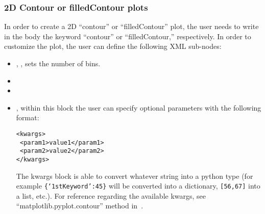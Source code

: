 \subsubsection{2D Contour or filledContour plots}
In order to create a 2D ``contour'' or ``filledContour'' plot, the user needs to
write in the  body the keyword ``contour'' or ``filledContour,''
respectively.
%
In order to customize the plot, the user can define the following XML sub-nodes:
\begin{itemize}
  \item {}, , sets the 
  number of bins.
  \item {}
  \item {}
  \item {}, within this block the user can specify optional
  parameters with the following format:

\begin{lstlisting}[style=XML]
<kwargs>
 <param1>value1</param1>
 <param2>value2</param2>
</kwargs>
\end{lstlisting}

    The kwargs block is able to convert whatever string into a python type (for
    example \texttt{\{`1stKeyword':45\}} will
    be converted into a dictionary, 
    \texttt{[56,67]} into a list, etc.).
  For reference regarding the available kwargs, see
  ``matplotlib.pyplot.contour'' method in~\cite{MatPlotLib}.
    \end{itemize}

